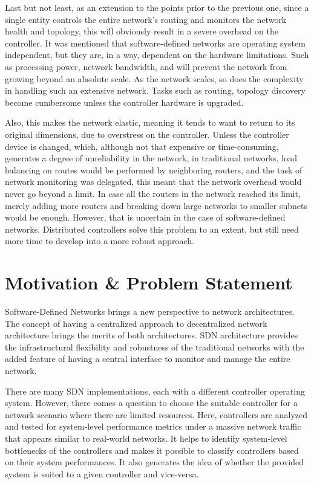     Last but not least, as an extension to the points prior to the previous one, since a single entity controls the entire network's routing and monitors the network health and topology, this will obviously result in a severe overhead on the controller. It was mentioned that software-defined networks are operating system independent, but they are, in a way, dependent on the hardware limitations. Such as processing power, network bandwidth, and will prevent the network from growing beyond an absolute scale. As the network scales, so does the complexity in handling such an extensive network. Tasks such as routing, topology discovery \cite{netflow2004} become cumbersome unless the controller hardware is upgraded.
    
    Also, this makes the network elastic, meaning it tends to want to return to its original dimensions, due to overstress on the controller. Unless the controller device is changed, which, although not that expensive or time-consuming, generates a degree of unreliability in the network, in traditional networks, load balancing on routes would be performed by neighboring routers, and the task of network monitoring was delegated, this meant that the network overhead would never go beyond a limit. In case all the routers in the network reached its limit, merely adding more routers and breaking down large networks to smaller subnets would be enough. However, that is uncertain in the case of software-defined networks. Distributed controllers solve this problem to an extent, but still need more time to develop into a more robust approach.
    
    \section{Motivation \& Problem Statement}
    
    Software-Defined Networks brings a new perspective to network architectures. The concept of having a centralized approach to decentralized network architecture brings the merits of both architectures. SDN architecture provides the infrastructural flexibility and robustness of the traditional networks with the added feature of having a central interface to monitor and manage the entire network.
    
    There are many SDN implementations, each with a different controller operating system. However, there comes a question to choose the suitable controller for a network scenario where there are limited resources. Here, controllers are analyzed and tested for system-level performance metrics under a massive network traffic that appears similar to real-world networks. It helps to identify system-level bottlenecks of the controllers and makes it possible to classify controllers based on their system performances. It also generates the idea of whether the provided system is suited to a given controller and vice-versa.